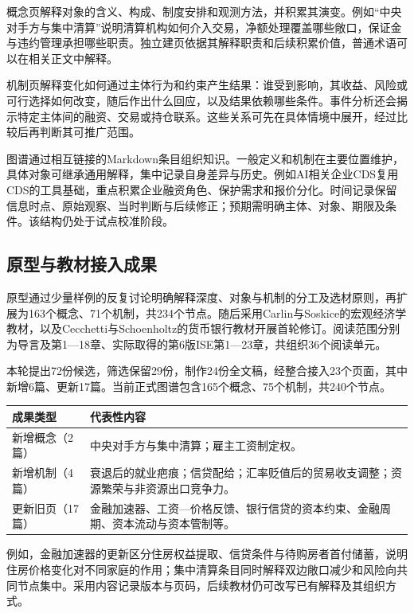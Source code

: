 \documentclass[11pt,letterpaper]{article}
\begin{document}
概念页解释对象的含义、构成、制度安排和观测方法，并积累其演变。例如“中央对手方与集中清算”说明清算机构如何介入交易，净额处理覆盖哪些敞口，保证金与违约管理承担哪些职责。独立建页依据其解释职责和后续积累价值，普通术语可以在相关正文中解释。

机制页解释变化如何通过主体行为和约束产生结果：谁受到影响，其收益、风险或可行选择如何改变，随后作出什么回应，以及结果依赖哪些条件。事件分析还会揭示特定主体间的融资、交易或持仓联系。这些关系可先在具体情境中展开，经过比较后再判断其可推广范围。

图谱通过相互链接的Markdown条目组织知识。一般定义和机制在主要位置维护，具体对象可继承通用解释，集中记录自身差异与历史。例如AI相关企业CDS复用CDS的工具基础，重点积累企业融资角色、保护需求和报价分化。时间记录保留信息时点、原始观察、当时判断与后续修正；预期需明确主体、对象、期限及条件。该结构仍处于试点校准阶段。

\subsection{原型与教材接入成果}

原型通过少量样例的反复讨论明确解释深度、对象与机制的分工及选材原则，再扩展为163个概念、71个机制，共234个节点。随后采用Carlin与Soskice的宏观经济学教材，以及Cecchetti与Schoenholtz的货币银行教材开展首轮修订\cite{carlin,cecchetti}。阅读范围分别为导言及第1—18章、实际取得的第6版ISE第1—23章，共组织36个阅读单元。

本轮提出72份候选，筛选保留29份，制作24份全文稿，经整合接入23个页面，其中新增6篇、更新17篇。当前正式图谱包含165个概念、75个机制，共240个节点。

\begin{center}
\small
\begin{tabularx}{\textwidth}{@{}L{0.17\textwidth}Y@{}}
\toprule
成果类型 & 代表性内容 \\
\midrule
新增概念（2篇） & 中央对手方与集中清算；雇主工资制定权。 \\
新增机制（4篇） & 衰退后的就业疤痕；信贷配给；汇率贬值后的贸易收支调整；资源繁荣与非资源出口竞争力。 \\
更新旧页（17篇） & 金融加速器、工资—价格反馈、银行信贷的资本约束、金融周期、资本流动与资本管制等。 \\
\bottomrule
\end{tabularx}
\end{center}

例如，金融加速器的更新区分住房权益提取、信贷条件与待购房者首付储蓄，说明住房价格变化对不同家庭的作用；集中清算条目同时解释双边敞口减少和风险向共同节点集中。采用内容记录版本与页码，后续教材仍可改写已有解释及其组织方式。
\end{document}
